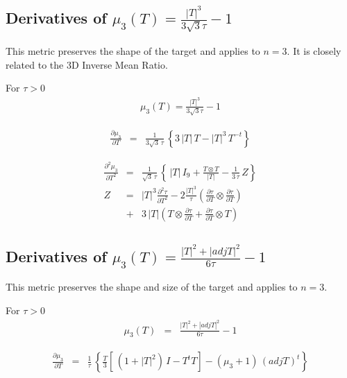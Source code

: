 \documentclass{report}
\begin{document}
\subsection{Derivatives of $\mu_3(T)=\frac{|T|^3}{3 \sqrt{3} \tau}-1$ \label{shape+3d}}

\noindent This metric preserves the shape of the target and applies
to $n=3$. It is closely related to the 3D Inverse Mean Ratio. \newline

\noindent For $\tau>0$
\begin{eqnarray}
\mu_3(T)=\frac{|T|^3}{3 \sqrt{3} \tau} - 1
\end{eqnarray}

\begin{eqnarray}
\frac{\partial \mu_3}{\partial T} & = & \frac{1}{3 \sqrt{3} \, \tau} \, \left\{ 3 \, |T| \, T - |T|^3 \, T^{-t} \right\}
\end{eqnarray}


\begin{eqnarray}
\frac{\partial^2 \mu_3}{\partial T^2} & = & \frac{1}{\sqrt{3} \, \tau} \, \left\{ \, |T| \, I_9 + \frac{T \otimes T}{|T|} - \frac{1}{3 \, \tau} \, Z \right\} \\
Z & = & |T|^3 \frac{\partial^2 \tau}{\partial T^2} - 2 \frac{|T|^3}{\tau} \left( \frac{\partial \tau}{\partial T} \otimes \frac{\partial \tau}{\partial T} \right) \nonumber \\
 & + & 3 \, |T| \left( T \otimes \frac{\partial \tau}{\partial T} + \frac{\partial \tau}{\partial T} \otimes T \right)
\end{eqnarray}

\subsection{Derivatives of $\mu_3(T)=\frac{|T|^2 + |adj T|^2}{6 \tau} - 1$ \label{ss+3d} }

\noindent This metric preserves the shape and size of the target and applies
to $n=3$. \newline

\noindent For $\tau>0$
\begin{eqnarray}
\mu_3 (T) & = & \frac{|T|^2 + |adj T|^2}{6 \tau} - 1
\end{eqnarray}

\begin{eqnarray}
\frac{\partial \mu_3}{\partial T} & = & \frac{1}{\tau} \, \left\{ \frac{T}{3} \left[ \, (1+|T|^2) \, I - T^t T \right] - (\mu_3+1) \, (adj T)^t \right\}
\end{eqnarray}
\end{document}
